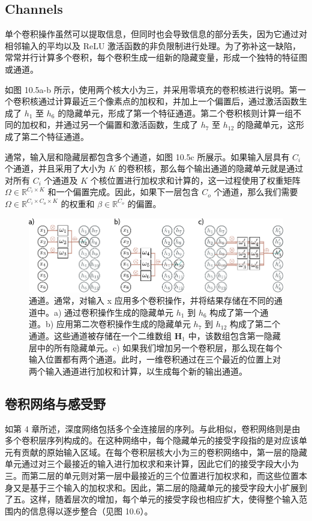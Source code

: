 \documentclass[lang=cn,newtx,10pt,scheme=chinese]{elegantbook}
\begin{document}
\subsection{Channels}
单个卷积操作虽然可以提取信息，但同时也会导致信息的部分丢失，因为它通过对相邻输入的平均以及 ReLU 激活函数的非负限制进行处理。为了弥补这一缺陷，常常并行计算多个卷积，每个卷积生成一组新的隐藏变量，形成一个独特的特征图或通道。

如图 10.5a-b 所示，使用两个核大小为三，并采用零填充的卷积核进行说明。第一个卷积核通过计算最近三个像素点的加权和，并加上一个偏置后，通过激活函数生成了 \(h_1\) 至 \(h_6\) 的隐藏单元，形成了第一个特征通道。第二个卷积核则计算一组不同的加权和，并通过另一个偏置和激活函数，生成了 \(h_7\) 至 \(h_{12}\) 的隐藏单元，这形成了第二个特征通道。

通常，输入层和隐藏层都包含多个通道，如图 10.5c 所展示。如果输入层具有 \(C_i\) 个通道，并且采用了大小为 \(K\) 的卷积核，那么每个输出通道的隐藏单元就是通过对所有 \(C_i\) 个通道及 \(K\) 个核位置进行加权求和计算的，这一过程使用了权重矩阵 \(\Omega \in \mathbb{R}^{C_i \times K}\) 和一个偏置完成。因此，如果下一层包含 \(C_o\) 个通道，那么我们需要 \(\Omega \in \mathbb{R}^{C_i \times C_o \times K}\) 的权重和 \(\beta \in \mathbb{R}^{C_o}\) 的偏置。


\begin{figure}[ht!]
\centering
\includegraphics[width=0.7\linewidth]{PDFFigures/UDLChap10PDF/Conv4a.pdf}
\caption{通道。通常，对输入 x 应用多个卷积操作，并将结果存储在不同的通道中。a) 通过卷积操作生成的隐藏单元 \(h_1\) 到 \(h_6\) 构成了第一个通道。b) 应用第二次卷积操作生成的隐藏单元 \(h_7\) 到 \(h_{12}\) 构成了第二个通道。这些通道被存储在一个二维数组 \(\mathbf{H}_1\) 中，该数组包含第一隐藏层中的所有隐藏单元。c) 如果我们增加另一个卷积层，那么现在每个输入位置都有两个通道。此时，一维卷积通过在三个最近的位置上对两个输入通道进行加权和计算，以生成每个新的输出通道。}
\end{figure}


\subsection{卷积网络与感受野}
如第 4 章所述，深度网络包括多个全连接层的序列。与此相似，卷积网络则是由多个卷积层序列构成的。在这种网络中，每个隐藏单元的接受字段指的是对应该单元有贡献的原始输入区域。在每个卷积层核大小为三的卷积网络中，第一层的隐藏单元通过对三个最接近的输入进行加权求和来计算，因此它们的接受字段大小为三。而第二层的单元则对第一层中最接近的三个位置进行加权求和，而这些位置本身又是基于三个输入的加权求和。因此，第二层的隐藏单元的接受字段大小扩展到了五。这样，随着层次的增加，每个单元的接受字段也相应扩大，使得整个输入范围内的信息得以逐步整合（见图 10.6）。
\end{document}
